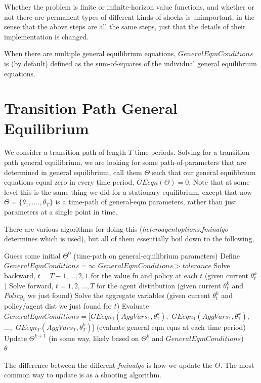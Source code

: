 \documentclass[11pt,fleqn]{article}
\begin{document}
Whether the problem is finite or infinite-horizon value functions, and whether or not there are permanent types of different kinds of shocks is unimportant, in the sense that the above steps are all the same steps, just that the details of their implementation is changed.

When there are multiple general equilibrium equations, $GeneralEqmConditions$ is (by default) defined as the sum-of-squares of the individual general equilibrium equations.


\section{Transition Path General Equilibrium}
We consider a transition path of length $T$ time periods. Solving for a transition path general equilibrium, we are looking for some path-of-parameters that are determined in general equilibrium, call them $\Theta$ such that our general equilibrium equations equal zero in every time period, $GEeqn(\Theta)=0$. Note that at some level this is the same thing we did for a stationary equilibrium, except that now $\Theta=\{\theta_1,....,\theta_T\}$ is a time-path of general-eqm parameters, rather than just parameters at a single point in time.

There are various algorithms for doing this (\textit{heteroagentoptions.fminalgo} determines which is used), but all of them essentially boil down to the following,
\begin{algorithmic}
 \State Guess some initial $\Theta^0$ (time-path on general-equilibrium parameters)
 \State Define $GeneralEqmConditions=\infty$
 \While $GeneralEqmConditions>tolerance$
 \State Solve backward, $t=T-1,\dots,2,1$ for the value fn and policy at each $t$ (given current $\theta^k_t$)
 \State Solve forward, $t=1,2,\dots,T$ for the agent distribution (given current $\theta^k_t$ and $Policy_t$ we just found)
 \State Solve the aggregate variables (given current $\theta_t^k$ and policy/agent dist we just found for $t$)
 \State Evaluate $GeneralEqmConditions=[GEeqn_1(AggVars_1,\theta_1^k),$ $GEeqn_1(AggVars_1,\theta_1^k),$$\dots,$ $GEeqn_T(AggVars_T,\theta_T^k)]$ (evaluate general eqm eqns at each time period)
 \State Update $\Theta^{k+1}$ (in some way, likely based on $\Theta^k$ and $GeneralEqmConditions$)
 \EndWhile
 \\ \Return $\theta$
\end{algorithmic}
The difference between the different \textit{fminalgo} is how we update the $\Theta$. The most common way to update is as a shooting algorithm.
\end{document}
